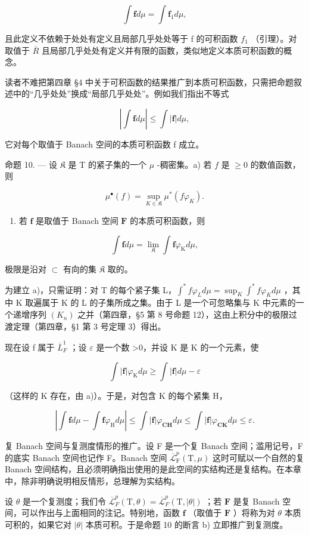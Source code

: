 \[
\int \mathbf {f} d \mu = \int \mathbf {f} _ {1} d \mu ,
\]

且此定义不依赖于处处有定义且局部几乎处处等于 f 的可积函数 \(f_{1}\) （引理）。对取值于 \(\overline{R}\) 且局部几乎处处有定义并有限的函数，类似地定义本质可积函数的概念。

读者不难把第四章 §4 中关于可积函数的结果推广到本质可积函数，只需把命题叙述中的“几乎处处”换成“局部几乎处处”。例如我们指出不等式

\[
\left| \int \mathbf {f} d \mu \right| \leqslant \int | \mathbf {f} | d \mu ,\tag{3}
\]

它对每个取值于 Banach 空间的本质可积函数 f 成立。

命题 10. --- 设 \(\mathfrak{K}\) 是 T 的紧子集的一个 \(\mu\) -稠密集。a) 若 \(f\) 是 \(\geqslant 0\) 的数值函数，则

\[
\mu^ {\bullet} (f) = \sup _ {K \in \mathfrak {K}} \mu^ {*} (f \varphi_ {K}).\tag{4}
\]

\begin{enumerate}
\def\labelenumi{\alph{enumi})}
\setcounter{enumi}{1}
\tightlist
\item
  若 \(\mathbf{f}\) 是取值于 Banach 空间 \(\mathbf{F}\) 的本质可积函数，则
\end{enumerate}

\[
\int \mathbf {f} d \mu = \lim _ {\mathfrak {K}} \int \mathbf {f} \varphi_ {\mathrm{K}} d \mu ,
\]

极限是沿对 \(\subset\) 有向的集 \(\mathfrak{K}\) 取的。

为建立 a)，只需证明：对 T 的每个紧子集 L，\(\int^{*}f\varphi_{L}d\mu=\sup_{K}\int^{*}f\varphi_{K}d\mu\) ，其中 K 取遍属于 K 的 L 的子集所成之集。由于 L 是一个可忽略集与 K 中元素的一个递增序列 \((K_{n})\) 之并（第四章，§5 第 8 号命题 12），这由上积分中的极限过渡定理（第四章，§1 第 3 号定理 3）得出。

现在设 f 属于 \(\overline{L}_{F}^{1}\) ；设 \(\varepsilon\) 是一个数 \textgreater0，并设 K 是 K 的一个元素，使

\[
\int | \mathbf {f} | \varphi_ {\mathrm{K}} d \mu \geqslant \int | \mathbf {f} | d \mu - \varepsilon
\]

（这样的 K 存在，由 a)）。于是，对包含 K 的每个紧集 H，

\[
\left| \int \mathbf {f} d \mu - \int \mathbf {f} \varphi_ {\mathrm{H}} d \mu \right| \leqslant \int | \mathbf {f} | \varphi_ {\mathbf {C H}} d \mu \leqslant \int | \mathbf {f} | \varphi_ {\mathbf {C K}} d \mu \leqslant \varepsilon .
\]

复 Banach 空间与复测度情形的推广。设 F 是一个复 Banach 空间；滥用记号，F 的底实 Banach 空间也记作 F。Banach 空间 \(\overline{\mathcal{L}}_{\mathrm{F}}^{p}(\mathrm{T},\mu)\) 这时可赋以一个自然的复 Banach 空间结构，且必须明确指出使用的是此空间的实结构还是复结构。在本章中，除非明确说明相反情形，总理解为实结构。

设 \(\theta\) 是一个复测度；我们令 \(\overline{\mathcal{L}}_F^p (\mathrm{T},\theta) = \overline{\mathcal{L}}_F^p (\mathrm{T},|\theta |)\) ；若 \(\mathbf{F}\) 是复 Banach 空间，可以作出与上面相同的注记。特别地，函数 \(\mathbf{f}\) （取值于 \(\mathbf{F}\) ）将称为对 \(\theta\) 本质可积的，如果它对 \(|\theta |\) 本质可积。于是命题 10 的断言 b) 立即推广到复测度。

